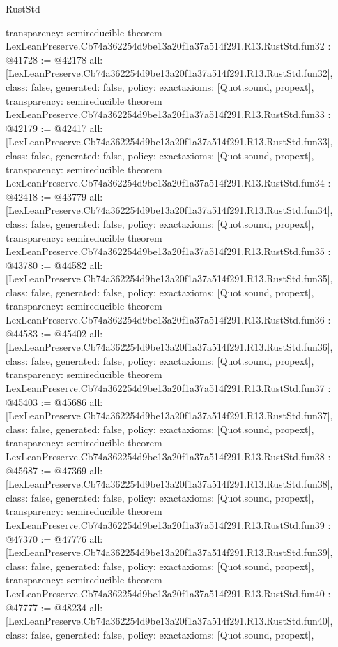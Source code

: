 \begin{lexlean}{RustStd}
\begin{coremodule}
{  transparency: semireducible
}
theorem LexLeanPreserve.Cb74a362254d9be13a20f1a37a514f291.R13.RustStd.fun32 : @41728 := @42178 {
  all: [LexLeanPreserve.Cb74a362254d9be13a20f1a37a514f291.R13.RustStd.fun32],
  class: false,
  generated: false,
  policy: exact{axioms: [Quot.sound, propext]},
  transparency: semireducible
}
theorem LexLeanPreserve.Cb74a362254d9be13a20f1a37a514f291.R13.RustStd.fun33 : @42179 := @42417 {
  all: [LexLeanPreserve.Cb74a362254d9be13a20f1a37a514f291.R13.RustStd.fun33],
  class: false,
  generated: false,
  policy: exact{axioms: [Quot.sound, propext]},
  transparency: semireducible
}
theorem LexLeanPreserve.Cb74a362254d9be13a20f1a37a514f291.R13.RustStd.fun34 : @42418 := @43779 {
  all: [LexLeanPreserve.Cb74a362254d9be13a20f1a37a514f291.R13.RustStd.fun34],
  class: false,
  generated: false,
  policy: exact{axioms: [Quot.sound, propext]},
  transparency: semireducible
}
theorem LexLeanPreserve.Cb74a362254d9be13a20f1a37a514f291.R13.RustStd.fun35 : @43780 := @44582 {
  all: [LexLeanPreserve.Cb74a362254d9be13a20f1a37a514f291.R13.RustStd.fun35],
  class: false,
  generated: false,
  policy: exact{axioms: [Quot.sound, propext]},
  transparency: semireducible
}
theorem LexLeanPreserve.Cb74a362254d9be13a20f1a37a514f291.R13.RustStd.fun36 : @44583 := @45402 {
  all: [LexLeanPreserve.Cb74a362254d9be13a20f1a37a514f291.R13.RustStd.fun36],
  class: false,
  generated: false,
  policy: exact{axioms: [Quot.sound, propext]},
  transparency: semireducible
}
theorem LexLeanPreserve.Cb74a362254d9be13a20f1a37a514f291.R13.RustStd.fun37 : @45403 := @45686 {
  all: [LexLeanPreserve.Cb74a362254d9be13a20f1a37a514f291.R13.RustStd.fun37],
  class: false,
  generated: false,
  policy: exact{axioms: [Quot.sound, propext]},
  transparency: semireducible
}
theorem LexLeanPreserve.Cb74a362254d9be13a20f1a37a514f291.R13.RustStd.fun38 : @45687 := @47369 {
  all: [LexLeanPreserve.Cb74a362254d9be13a20f1a37a514f291.R13.RustStd.fun38],
  class: false,
  generated: false,
  policy: exact{axioms: [Quot.sound, propext]},
  transparency: semireducible
}
theorem LexLeanPreserve.Cb74a362254d9be13a20f1a37a514f291.R13.RustStd.fun39 : @47370 := @47776 {
  all: [LexLeanPreserve.Cb74a362254d9be13a20f1a37a514f291.R13.RustStd.fun39],
  class: false,
  generated: false,
  policy: exact{axioms: [Quot.sound, propext]},
  transparency: semireducible
}
theorem LexLeanPreserve.Cb74a362254d9be13a20f1a37a514f291.R13.RustStd.fun40 : @47777 := @48234 {
  all: [LexLeanPreserve.Cb74a362254d9be13a20f1a37a514f291.R13.RustStd.fun40],
  class: false,
  generated: false,
  policy: exact{axioms: [Quot.sound, propext]},
}
\end{coremodule}
\end{lexlean}
